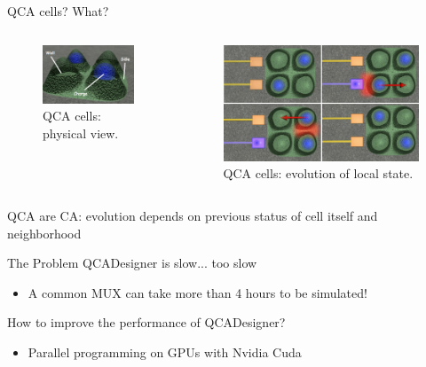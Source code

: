 \documentclass[10pt, red]{beamer}
\begin{document}
	\begin{frame}{QCA cells? What?}
		\begin{columns}
		 	\begin{figure}
				\centering
				\includegraphics[width=\textwidth]{img/qca.png}
				\caption{QCA cells: physical view.}
		 	\end{figure} 
			\begin{figure}
				\centering
				\includegraphics[width=\textwidth]{img/qcaevo.png}
				\caption{QCA cells: evolution of local state.}
			\end{figure}
		\end{columns}
		QCA are CA: evolution depends on previous status of cell itself and neighborhood
	\end{frame}

	\begin{frame}{The Problem}
	 	QCADesigner is slow... too slow
		\begin{itemize}
			\item A common MUX can take more than 4 hours to be simulated!
		\end{itemize}
		How to improve the performance of QCADesigner?
		\begin{itemize}
			\item Parallel programming on GPUs with Nvidia Cuda  
		\end{itemize}
	\end{frame}
\end{document}
